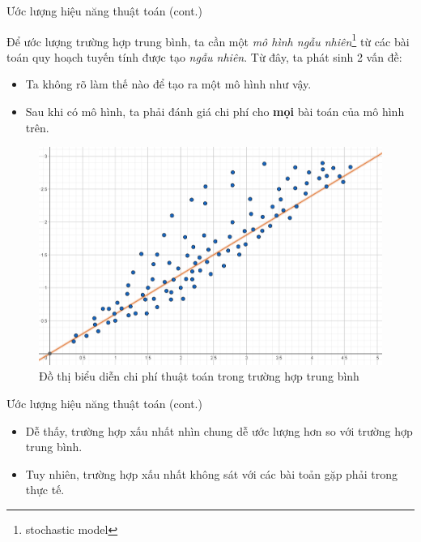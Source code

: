 \documentclass[10pt]{beamer}
\begin{document}
\begin{frame}{Ước lượng hiệu năng thuật toán (cont.)}
\begin{multicols}{2}
Để ước lượng  trường hợp trung bình, ta cần một \textit{mô hình ngẫu nhiên}\footnote{stochastic model} từ các bài toán quy hoạch tuyến tính được tạo \textit{ngẫu nhiên}. Từ đây, ta phát sinh 2 vấn đề:
\begin{itemize}
\item Ta không rõ làm thế nào để tạo ra một mô hình như vậy.
\item Sau khi có mô hình, ta phải đánh giá chi phí cho \textbf{mọi} bài toán của mô hình trên.
\end{itemize}
\columnbreak
\begin{figure}
\centering
\includegraphics[width=\linewidth]{img/average-case.png}
\caption{Đồ thị biểu diễn chi phí thuật toán trong trường hợp trung bình}
\end{figure}
\end{multicols}
\end{frame}

\begin{frame}{Ước lượng hiệu năng thuật toán (cont.)}
\begin{itemize}
\item Dễ thấy, trường hợp xấu nhất nhìn chung dễ ước lượng hơn so với trường hợp trung bình.
\item Tuy nhiên, trường hợp xấu nhất không sát với các bài toản gặp phải trong thực tế.
\end{itemize}
\end{frame}
\end{document}
